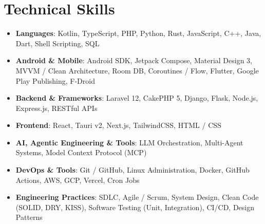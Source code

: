 \documentclass[letterpaper,11pt]{article}
\newcommand{\resumeItem}[1]{
  \item\small{#1 \vspace{-2pt}}
}
\newcommand{\resumeSubHeadingListStartCompact}{\begin{itemize}[leftmargin=0.15in, label={}, itemsep=4pt, topsep=6pt, parsep=0pt]}
\newcommand{\resumeSubHeadingListEnd}{\end{itemize}}
\begin{document}
\section{Technical Skills}
\resumeSubHeadingListStartCompact
  \resumeItem{\textbf{Languages}: Kotlin, TypeScript, PHP, Python, Rust, JavaScript, C++, Java, Dart, Shell Scripting, SQL}
  \resumeItem{\textbf{Android \& Mobile}: Android SDK, Jetpack Compose, Material Design 3, MVVM / Clean Architecture, Room DB, Coroutines / Flow, Flutter, Google Play Publishing, F-Droid}
  \resumeItem{\textbf{Backend \& Frameworks}: Laravel 12, CakePHP 5, Django, Flask, Node.js, Express.js, RESTful APIs}
  \resumeItem{\textbf{Frontend}: React, Tauri v2, Next.js, TailwindCSS, HTML / CSS}
  \resumeItem{\textbf{AI, Agentic Engineering \& Tools}: LLM Orchestration, Multi-Agent Systems, Model Context Protocol (MCP)}
  \resumeItem{\textbf{DevOps \& Tools}: Git / GitHub, Linux Administration, Docker, GitHub Actions, AWS, GCP, Vercel, Cron Jobs}
  \resumeItem{\textbf{Engineering Practices}: SDLC, Agile / Scrum, System Design, Clean Code (SOLID, DRY, KISS), Software Testing (Unit, Integration), CI/CD, Design Patterns}
\resumeSubHeadingListEnd

\end{document}
